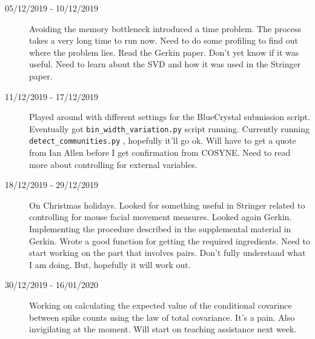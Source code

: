 \documentclass[a4paper,12pt]{article}
\theoremstyle{definition}
\begin{document}
\begin{description}
                                \item[05/12/2019 - 10/12/2019] Avoiding the memory bottleneck introduced a time problem. The process takes a very long time to run now. Need to do some profiling to find out where the problem lies. Read the Gerkin paper. Don't yet know if it was useful. Need to learn about the SVD and how it was used in the Stringer paper.

                                \item[11/12/2019 - 17/12/2019] Played around with different settings for the BlueCrystal submission script. Eventually got \texttt{bin\_width\_variation.py} script running. Currently running \texttt{detect\_communities.py} , hopefully it'll go ok. Will have to get a quote from Ian Allen before I get confirmation from COSYNE. Need to read more about controlling for external variables.

                                \item[18/12/2019 - 29/12/2019] On Christmas holidays. Looked for something useful in Stringer related to controlling for mouse facial movement measures. Looked again Gerkin. Implementing the procedure described in the supplemental material in Gerkin. Wrote a good function for getting the required ingredients. Need to start working on the part that involves pairs. Don't fully understand what I am doing. But, hopefully it will work out.
                                
                                \item[30/12/2019 - 16/01/2020] Working on calculating the expected value of the conditional covarince between spike counts using the law of total covariance. It's a pain. Also invigilating at the moment. Will start on teaching assistance next week.



  \end{description}
\end{document}
